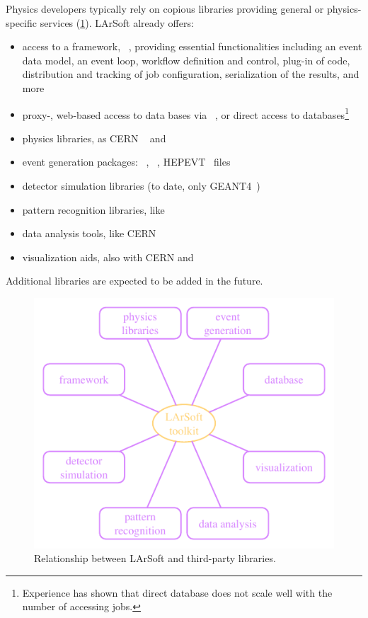 Physics developers typically rely on copious libraries providing general or physics-specific services
(\cref{fig:LArSoftRelations:Libraries}).
LArSoft already offers:
\begin{itemize}
   \item access to a framework, \ART~\cite{ART}, providing essential functionalities
      including an event data model, an event loop, workflow definition and control,
      plug-in of code, distribution and tracking of job configuration,
      serialization of the results, and more
   \item proxy-, web-based access to data bases via \libwda~\cite{libwda},
      or direct access to \PostgreSQL databases\footnote{%
      Experience has shown that direct database does not scale well with the number of accessing jobs.%
      }
   \item physics libraries, as CERN \CLHEP~\cite{CLHEP} and \nutools~\cite{nutools}
   \item event generation packages: \GENIE~\cite{GENIE}, \CRY~\cite{CRY}, HEPEVT~\cite{HEPEVT} files
   \item detector simulation libraries (to date, only GEANT4~\cite{GEANT})
   \item pattern recognition libraries, like \Pandora
   \item data analysis tools, like CERN \ROOT~\cite{ROOT}
   \item visualization aids, also with CERN \ROOT and \nutools
\end{itemize}
Additional libraries are expected to be added in the future.
\begin{figure}
   \centering\includegraphics{figures/LArSoftThirdPartyLibraries}
   \caption{\label{fig:LArSoftRelations:Libraries}
      Relationship between LArSoft and third-party libraries.
   }
\end{figure}
